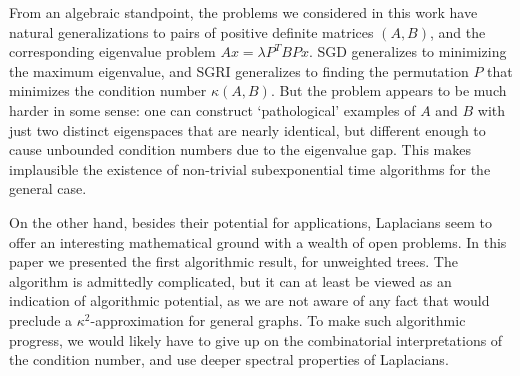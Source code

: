 %
%

%
From an algebraic standpoint, the problems we considered in this work have natural generalizations to pairs of positive definite matrices $(A,B)$, and the corresponding eigenvalue problem $Ax = \lambda P^T B Px$. SGD generalizes to minimizing the maximum eigenvalue, and SGRI generalizes to finding the permutation $P$ that minimizes the condition number $\kappa(A,B)$. 
But the problem appears to be much harder in some sense: one can construct `pathological' examples of $A$ and $B$ with just two distinct eigenspaces that are nearly identical, but different enough to cause unbounded condition numbers due to the eigenvalue gap. This makes implausible the existence of non-trivial subexponential time algorithms for the general case. 

On the other hand, besides their potential for applications, Laplacians seem to offer an interesting mathematical ground with a wealth of open problems. In this paper we presented the first algorithmic result, for unweighted trees. The algorithm is admittedly complicated, but it can at least be viewed as an indication of algorithmic potential, as we are not aware of any fact that would preclude a $\kappa^2$-approximation for general graphs. To make such algorithmic progress, we would likely have to give up on the combinatorial interpretations of the condition number, and use deeper spectral properties of Laplacians. 

